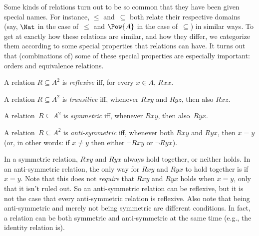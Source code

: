\documentclass[../../../include/open-logic-section]{subfiles}
\begin{document}

\begin{intro}
Some kinds of relations turn out to be so common that they have been
given special names.  For instance, $\le$ and~$\subseteq$ both relate
their respective domains (say, $\Nat$ in the case of~$\le$ and
$\Pow{A}$ in the case of~$\subseteq$) in similar ways.  To get at
exactly how these relations are similar, and how they differ, we
categorize them according to some special properties that relations
can have.  It turns out that (combinations of) some of these special
properties are especially important: orders and equivalence relations.
\end{intro}

\begin{defn}[Reflexivity]
A relation $R \subseteq A^2$ is \emph{reflexive} iff, for every $x \in
A$, $Rxx$.
\end{defn}

\begin{defn}[Transitivity]
A relation $R \subseteq A^2$ is \emph{transitive} iff, whenever $Rxy$
and $Ryz$, then also $Rxz$.
\end{defn}

\begin{defn}[Symmetry]
A relation~$R \subseteq A^2$ is \emph{symmetric} iff, whenever
$Rxy$, then also~$Ryx$.
\end{defn}

\begin{defn}
A relation~$R \subseteq A^2$ is \emph{anti-sym\-met\-ric} iff, whenever both
$Rxy$ and $Ryx$, then $x=y$ (or, in other words: if $x\neq y$ then
either $\lnot Rxy$ or $\lnot Ryx$).
\end{defn}

\begin{explain}
In a symmetric relation, $Rxy$ and $Ryx$ always hold together, or
neither holds.  In an anti-symmetric relation, the only way for $Rxy$
and $Ryx$ to hold together is if $x = y$.  Note that this does not
\emph{require} that $Rxy$ and $Ryx$ holds when $x = y$, only that it
isn't ruled out.  So an anti-symmetric relation can be reflexive, but
it is not the case that every anti-symmetric relation is
reflexive.  Also note that being anti-symmetric and merely not being
symmetric are different conditions.  In fact, a relation can be both
symmetric and anti-symmetric at the same time (e.g., the identity
relation is).
\end{explain}
\end{document}
